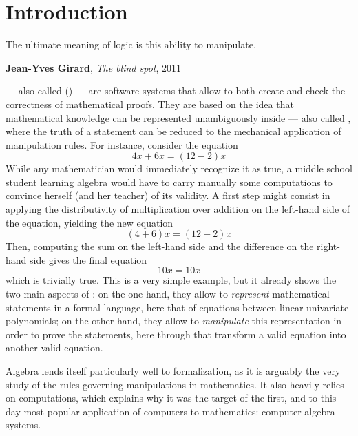 \setchapterpreamble[u]{\margintoc}
\chapter{Introduction}

\epigraph{The ultimate meaning of logic is this ability to manipulate.}
{\textbf{Jean-Yves Girard}, \textit{The blind spot}, 2011}


\AP {} --- also called  () --- are software systems that allow to both create and
check the correctness of mathematical proofs. They are based on the idea that
mathematical knowledge can be represented unambiguously inside  --- also called , where the truth of a
statement can be reduced to the mechanical application of 
manipulation rules. For instance, consider the equation
$$4x + 6x = (12 - 2)x$$ 
While any mathematician would immediately recognize it as true, a middle school
student learning algebra would have to carry manually some computations to
convince herself (and her teacher) of its validity. A first step might consist
in applying the distributivity of multiplication over addition on the left-hand
side of the equation, yielding the new equation
$$(4 + 6)x = (12 - 2)x$$
Then, computing the sum on the left-hand side and the difference on the
right-hand side gives the final equation
$$10x = 10x$$
\AP which is trivially true. This is a very simple example, but it already shows
the two main aspects of : on the one hand, they allow to
\emph{represent} mathematical statements in a formal language, here that of
equations between linear univariate polynomials; on the other hand, they allow
to \emph{manipulate} this representation in order to prove the statements, here
through  that transform a valid equation into another
valid equation.

Algebra lends itself particularly well to formalization, as it is arguably the
very study of the rules governing  manipulations in mathematics. It also
heavily relies on computations, which explains why it was the target of the
first, and to this day most popular application of computers to mathematics:
computer algebra systems.

